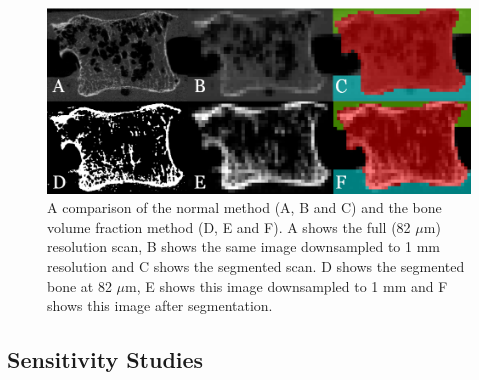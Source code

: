 \begin{figure}[ht!]
\centering
\includegraphics[width=.65\textwidth]{Chapters/Chapter_HT_images/normal_vs_bvtv_seg.png}
	\caption{A comparison of the normal method (A, B and C) and the bone volume
fraction method (D, E and F). A shows the full (82 $\mu$m) resolution scan, B
shows the same image downsampled to 1 mm resolution and C shows the segmented
scan. D shows the segmented bone at 82 $\mu$m, E shows this image downsampled
to 1 mm and F shows this image after segmentation.}
\label{fig:normal_vs_bv_tv_seg}
\end{figure}






\subsection{Sensitivity Studies}


